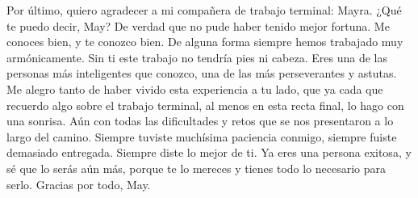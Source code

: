 Por último, quiero agradecer a mi compañera de trabajo terminal: Mayra. ¿Qué te puedo decir, May? De verdad que no pude haber tenido mejor fortuna. Me conoces bien, y te conozco bien. De alguna forma siempre hemos trabajado muy armónicamente. Sin ti este trabajo no tendría pies ni cabeza. Eres una de las personas más inteligentes que conozco, una de las más perseverantes y astutas. Me alegro tanto de haber vivido esta experiencia a tu lado, que ya cada que recuerdo algo sobre el trabajo terminal, al menos en esta recta final, lo hago con una sonrisa. Aún con todas las dificultades y retos que se nos presentaron a lo largo del camino. Siempre tuviste muchísima paciencia conmigo, siempre fuiste demasiado entregada. Siempre diste lo mejor de ti. Ya eres una persona exitosa, y sé que lo serás aún más, porque te lo mereces y tienes todo lo necesario para serlo. Gracias por todo, May.\\
